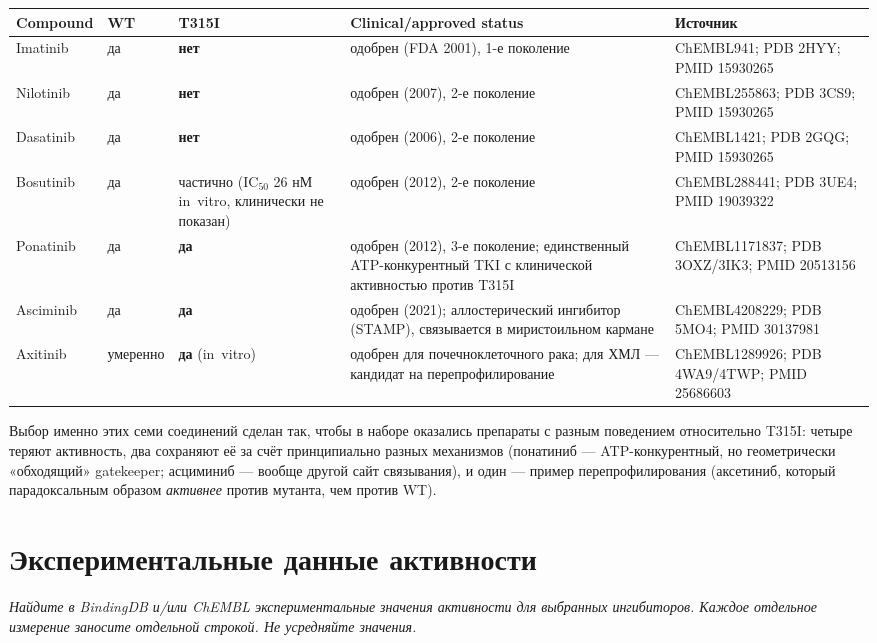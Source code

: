 \documentclass[11pt,a4paper]{article}
\newcommand{\instr}[1]{{\small\itshape #1\par}}
\begin{document}
\begin{center}
\small
\begin{tabular}{|L{1.9cm}|L{1.4cm}|L{2.6cm}|L{3.6cm}|L{3.6cm}|}
\hline
\textbf{Compound} & \textbf{WT} & \textbf{T315I} & \textbf{Clinical/approved status} &
\textbf{Источник} \\
\hline
Imatinib & да & \textbf{нет} & одобрен (FDA 2001), 1-е поколение &
ChEMBL941; PDB 2HYY; PMID 15930265 \\
\hline
Nilotinib & да & \textbf{нет} & одобрен (2007), 2-е поколение &
ChEMBL255863; PDB 3CS9; PMID 15930265 \\
\hline
Dasatinib & да & \textbf{нет} & одобрен (2006), 2-е поколение &
ChEMBL1421; PDB 2GQG; PMID 15930265 \\
\hline
Bosutinib & да & частично (IC$_{50}$ 26 нМ in~vitro, клинически не показан) &
одобрен (2012), 2-е поколение & ChEMBL288441; PDB 3UE4; PMID 19039322 \\
\hline
Ponatinib & да & \textbf{да} & одобрен (2012), 3-е поколение; единственный
ATP-конкурентный TKI с клинической активностью против T315I &
ChEMBL1171837; PDB 3OXZ/3IK3; PMID 20513156 \\
\hline
Asciminib & да & \textbf{да} & одобрен (2021); аллостерический ингибитор (STAMP),
связывается в миристоильном кармане & ChEMBL4208229; PDB 5MO4; PMID 30137981 \\
\hline
Axitinib & умеренно & \textbf{да} (in~vitro) & одобрен для почечно\-клеточного рака;
для ХМЛ --- кандидат на перепрофилирование &
ChEMBL1289926; PDB 4WA9/4TWP; PMID 25686603 \\
\hline
\end{tabular}
\end{center}

Выбор именно этих семи соединений сделан так, чтобы в наборе оказались препараты с
разным поведением относительно T315I: четыре теряют активность, два сохраняют её за счёт
принципиально разных механизмов (понатиниб --- ATP-конкурентный, но геометрически
«обходящий» gatekeeper; асциминиб --- вообще другой сайт связывания), и один --- пример
перепрофилирования (аксетиниб, который парадоксальным образом \emph{активнее} против
мутанта, чем против WT).

\section{Экспериментальные данные активности}
\instr{Найдите в BindingDB и/или ChEMBL экспериментальные значения активности для
выбранных ингибиторов. Каждое отдельное измерение заносите отдельной строкой.
Не усредняйте значения.}
\end{document}
